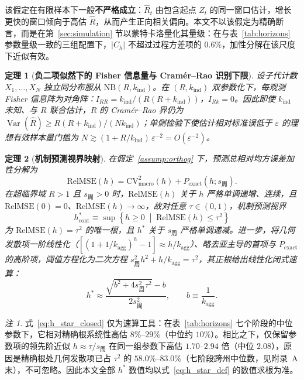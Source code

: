 \documentclass[10pt,UTF8,a4paper,zihao=-4]{ctexart}
\theoremstyle{plain}
\newtheorem{theorem}{定理}
\theoremstyle{definition}
\theoremstyle{remark}
\newtheorem{remark}{注}
\begin{document}
该假定在有限样本下一般\textbf{不严格成立}：$\hat{R}_t$ 由包含起点 $Z_t$ 的同一窗口估计，增长更快的窗口倾向于高估 $\hat{R}$，从而产生正向相关偏向。本文不以该假定为精确断言，而是在第~\ref{sec:simulation} 节以蒙特卡洛量化其量级：在与表~\ref{tab:horizons} 参数量级一致的三组配置下，$|C_h|$ 不超过过程方差项的 $0.6\%$，加性分解在该尺度下近似有效。

\begin{theorem}[\textbf{负二项似然下的 Fisher 信息量与 Cram\'er--Rao 识别下限}]\label{thm:fisher}
设子代计数 $X_1,\dots,X_N$ 独立同分布服从 $\text{NB}(R, k_{\text{ind}})$。在 $(R, k_{\text{ind}})$ 双参数化下，每观测 Fisher 信息阵为对角阵：$I_{RR} = k_{\text{ind}}/(R(R+k_{\text{ind}}))$，$I_{Rk}=0$。因此即使 $k_{\text{ind}}$ 未知、与 $R$ 联合估计，$R$ 的 Cram\'er--Rao 界仍为 $\operatorname{Var}(\hat{R}) \ge R(R+k_{\text{ind}})/(N k_{\text{ind}})$；单侧检验下使估计相对标准误低于 $\varepsilon$ 的理想有效样本量门槛为 $N \gtrsim (1 + R/k_{\text{ind}})\,\varepsilon^{-2} = O(\varepsilon^{-2})$。
\end{theorem}

\begin{theorem}[\textbf{机制预测视界映射}]\label{thm:horizon}
在假定~\ref{assump:orthog} 下，预测总相对均方误差加性分解为
\begin{equation}
\text{RelMSE}(h) = \text{CV}^2_{\text{macro}}(h) + P_{\text{exact}}(h;s_{\text{周}}).
\label{eq:relmse_additive}
\end{equation}
在超临界域 $R>1$ 且 $s_{\text{周}}>0$ 时，$\text{RelMSE}(h)$ 关于 $h$ 严格单调递增、连续，且 $\text{RelMSE}(0)=0$、$\text{RelMSE}(h)\to\infty$，故对任意 $\tau \in (0,1)$，机制预测视界
\begin{equation}
h^*_{\text{cont}} \equiv \sup\left\{h \ge 0 \;\middle|\; \text{RelMSE}(h) \le \tau^2\right\} \label{eq:h_star_def}
\end{equation}
为 $\text{RelMSE}(h) = \tau^2$ 的唯一根，且 $h^*$ 关于 $s_{\text{周}}$ 严格单调递减。进一步，将几何发散项一阶线性化（$[(1+1/k_{\text{agg}})^h - 1] \approx h/k_{\text{agg}}$）、略去亚主导的首项与 $P_{\text{exact}}$ 的高阶项，阈值方程化为二次方程 $s_{\text{周}}^2 h^2 + h/k_{\text{agg}} = \tau^2$，其正根给出线性化闭式速算：
\begin{equation}
h^* \approx \frac{\sqrt{b^2 + 4 s_{\text{周}}^2 \tau^2} - b}{2 s_{\text{周}}^2}, \qquad b \equiv \frac{1}{k_{\text{agg}}}. \label{eq:h_star_closed}
\end{equation}
\end{theorem}

\begin{remark}\label{rem:approx_accuracy}
式~\eqref{eq:h_star_closed} 仅为速算工具：在表~\ref{tab:horizons} 七个阶段的中位参数下，它相对精确根系统性高估 $8\%$--$29\%$（中位约 $10\%$）。相比之下，仅保留参数项的领先阶近似 $h \approx \tau/s_{\text{周}}$ 在同一组参数下高估 $1.70$--$2.94$ 倍（中位 $2.08$），原因是精确根处几何发散项已占 $\tau^2$ 的 $58.0\%$--$83.0\%$（七阶段跨州中位数，见附录~A 末），不可忽略。因此本文全部 $h^*$ 数值均以式~\eqref{eq:h_star_def} 的数值求根为准。
\end{remark}
\end{document}
